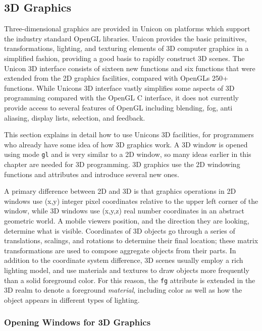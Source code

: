 \subsection{3D Graphics}

Three-dimensional graphics are provided in Unicon on platforms which
support the industry standard OpenGL libraries. Unicon provides the
basic primitives, transformations, lighting, and texturing elements
of 3D computer graphics in a simplified fashion, providing a good basis
to rapidly construct 3D scenes. The Unicon 3D interface consists of
sixteen new functions and six functions that were extended from the 2D
graphics facilities, compared with OpenGL{\textquotesingle}s 250+
functions. While Unicon{\textquotesingle}s 3D interface vastly
simplifies some aspects of 3D programming compared with the OpenGL C
interface, it does not currently provide access to several features of
OpenGL including blending, fog, anti aliasing, display lists,
selection, and feedback.

This section explains in detail how to use Unicon{\textquotesingle}s 3D
facilities, for programmers who already have some idea of how 3D
graphics work. A 3D window is opened using mode
\texttt{{\textquotedbl}gl{\textquotedbl}} and is very similar to a 2D window,
so many ideas earlier in this chapter are needed for 3D
programming. 3D graphics use the 2D windowing functions and attributes
and introduce several new ones.

A primary difference between 2D and 3D is that graphics operations in 2D
windows use (x,y) integer pixel coordinates relative to the
upper left corner of the window, while 3D windows use (x,y,z) real
number coordinates in an abstract geometric world. A mobile
viewer{\textquotesingle}s position, and the direction they are looking,
determine what is visible. Coordinates of 3D objects go through a
series of translations, scalings, and rotations to determine their
final location; these matrix transformations are used to compose
aggregate objects from their parts. In addition to the coordinate
system difference, 3D scenes usually employ a rich lighting model, and
use materials and textures to draw objects more frequently than a solid
foreground color. For this reason, the \texttt{fg} attribute is extended in the
3D realm to denote a foreground \textit{material}, including color as
well as how the object appears in different types of lighting.

\subsubsection{Opening Windows for 3D Graphics}

